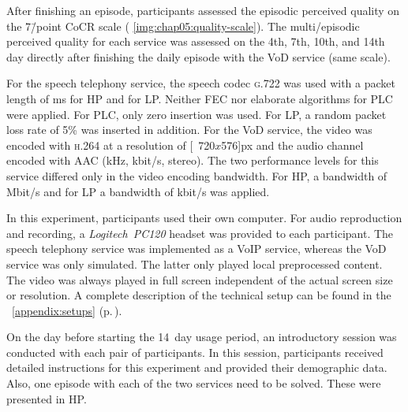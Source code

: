 After finishing an episode, participants assessed the episodic perceived quality on the 7\=/point \ac{CoCR} scale (\cf{} \autoref{img:chap05:quality-scale}).
The multi\-/episodic perceived quality for each service was assessed on the 4th, 7th, 10th, and 14th day directly after finishing the daily episode with the \ac{VoD} service (same scale).

For the speech telephony service, the speech codec \textsc{\lowercase{G.722}} was used with a packet length of \unit[20]{ms} for \ac{HP} and for \ac{LP}.
Neither \acs{FEC} nor elaborate algorithms for \acs{PLC} were applied.
For \acs{PLC}, only zero insertion was used.
For \ac{LP}, a random packet loss rate of 5\% was inserted in addition.
For the \ac{VoD} service, the video was encoded with \textsc{\lowercase{H.264}} at a resolution of \unit[720$x$576]{px} and the audio channel encoded with \acs{AAC} (\unit[48]{kHz}, \unit[165]{kbit/s}, stereo).
The two performance levels for this service differed only in the video encoding bandwidth.
For \ac{HP}, a bandwidth of \unit[2]{Mbit/s} and for \ac{LP} a bandwidth of \unit[125]{kbit/s} was applied.

In this experiment, participants used their own computer.
For audio reproduction and recording, a \emph{Logitech~PC120} headset was provided to each participant.
The speech telephony service was implemented as a \ac{VoIP} service, whereas the \ac{VoD} service was only simulated.
The latter only played local preprocessed content.
The video was always played in full screen independent of the actual screen size or resolution.
A complete description of the technical setup can be found in the \appendix{}~\ref{appendix:setups} (p.\,\pageref{appendix:setups}).

On the day before starting the 14~day usage period, an introductory session was conducted with each pair of participants.
In this session, participants received detailed instructions for this experiment and provided their demographic data.
Also, one episode with each of the two services need to be solved.
These were presented in \ac{HP}.

